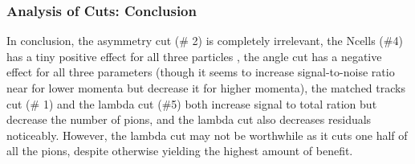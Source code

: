 \documentclass{beamer}
\begin{document}
\frame
{
\frametitle{Analysis of Cuts: Conclusion}
In conclusion, the asymmetry cut (\# 2) is completely irrelevant, the Ncells (\#4) has a tiny positive effect for all three particles , the angle cut has a negative effect for all three parameters (though it seems to increase signal-to-noise ratio near for lower momenta but decrease it for higher momenta), the matched tracks cut (\# 1) and the lambda cut (\#5) both increase signal to total ration but decrease the number of pions, and the lambda cut also decreases residuals noticeably. However, the lambda cut may not be worthwhile as it cuts one half of all the pions, despite otherwise yielding the highest amount of benefit.
}
\end{document}
